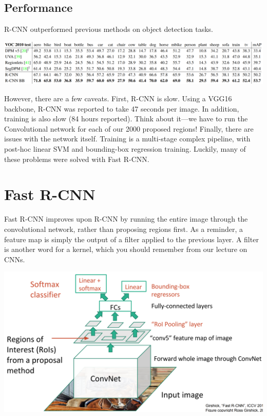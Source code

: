 \documentclass{article}
\begin{document}
\subsection{Performance}
R-CNN outperformed previous methods on object detection tasks.

\begin{center}
\includegraphics[scale=0.47]{rcnnresults.PNG}
\end{center}

However, there are a few caveats. First, R-CNN is slow. Using a VGG16 backbone, R-CNN was reported to take 47 seconds per image. In addition, training is also slow (84 hours reported). Think about it---we have to run the Convolutional network for each of our 2000 proposed regions! Finally, there are issues with the network itself. Training is a multi-stage complex pipeline, with post-hoc linear SVM and bounding-box regression training. Luckily, many of these problems were solved with Fast R-CNN.

\section{Fast R-CNN}
Fast R-CNN improves upon R-CNN by running the entire image through the convolutional network, rather than proposing regions first. As a reminder, a feature map is simply the output of a filter applied to the previous layer. A filter is another word for a kernel, which you should remember from our lecture on CNNs.

\begin{center}
\includegraphics[scale=0.35]{fastrcnn.PNG}
\end{center}
\end{document}
